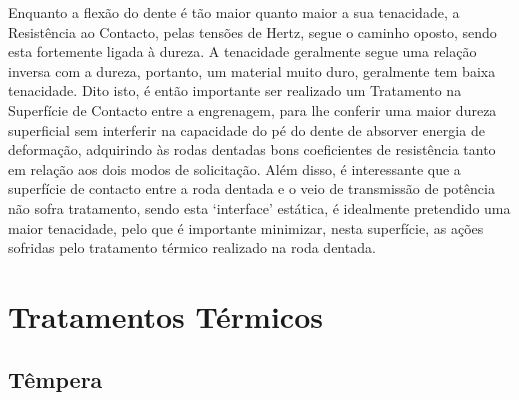\par  
Enquanto a flexão do dente é tão maior quanto maior a sua tenacidade, a Resistência ao Contacto, pelas tensões de Hertz, segue o caminho oposto, sendo esta fortemente ligada à dureza. A tenacidade geralmente segue uma relação inversa com a dureza, portanto, um material muito duro, geralmente tem baixa tenacidade.
Dito isto, é então importante ser realizado um Tratamento na Superfície de Contacto entre a engrenagem, para lhe conferir uma maior dureza superficial sem interferir na capacidade do pé do dente de absorver energia de deformação, adquirindo às rodas dentadas bons coeficientes de resistência tanto em relação aos dois modos de solicitação. Além disso, é interessante que a superfície de contacto entre a roda dentada e o veio de transmissão de potência não sofra tratamento, sendo esta ‘interface’ estática, é idealmente pretendido uma maior tenacidade, pelo que é importante minimizar, nesta superfície, as ações sofridas pelo tratamento térmico realizado na roda dentada.
\newpage
\section{Tratamentos Térmicos} \label{sec:soa_tratamentos}
\subsection{Têmpera} \label{ssec:soa_tratamentos_tempera}

